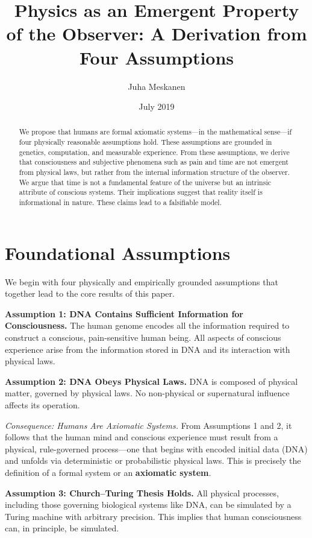 \documentclass[11pt]{article}
\title{Physics as an Emergent Property of the Observer: A Derivation from Four Assumptions}
\author{Juha Meskanen}
\date{July 2019}
\begin{document}
\maketitle

\begin{abstract}
  We propose that humans are formal axiomatic systems—in the mathematical sense—if four physically reasonable assumptions hold. These assumptions are grounded in genetics, computation, and measurable experience. From these assumptions, we derive that consciousness and subjective phenomena such as pain and time are not emergent from physical laws, but rather from the internal information structure of the observer. We argue that time is not a fundamental feature of the universe but an intrinsic attribute of conscious systems. Their implications suggest that reality itself is informational in nature. These claims lead to a falsifiable model.
\end{abstract}

\section{Foundational Assumptions}

We begin with four physically and empirically grounded assumptions that together lead to the core results of this paper.

\textbf{Assumption 1: DNA Contains Sufficient Information for Consciousness.}
The human genome encodes all the information required to construct a conscious, pain-sensitive human being. All aspects of conscious experience arise from the information stored in DNA and its interaction with physical laws.

\textbf{Assumption 2: DNA Obeys Physical Laws.}
DNA is composed of physical matter, governed by  physical laws. No non-physical or supernatural influence affects its operation.

\vspace{0.5em}
\textit{Consequence: Humans Are Axiomatic Systems.}
From Assumptions 1 and 2, it follows that the human mind and conscious experience must result from a physical, rule-governed process—one that begins with encoded initial data (DNA) and unfolds via deterministic or probabilistic physical laws. This is precisely the definition of a formal system or an \textbf{axiomatic system}.

\vspace{0.5em}
\textbf{Assumption 3: Church–Turing Thesis Holds.}
All physical processes, including those governing biological systems like DNA, can be simulated by a Turing machine with arbitrary precision. This implies that human consciousness can, in principle, be simulated.
\end{document}
